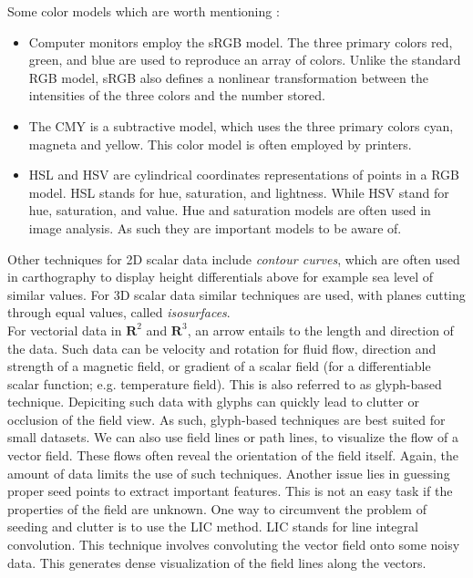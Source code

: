 \documentclass[main.tex]{subfiles}
\begin{document}
Some color models which are worth mentioning :
\begin{itemize}
\item Computer monitors employ the sRGB model. The three primary colors red, green, 
and blue are used to reproduce an array of colors. Unlike the standard RGB model, sRGB also 
defines a nonlinear transformation between the intensities of the three colors and the number 
stored.
\item The CMY is a subtractive model, which uses the three primary colors cyan, magneta and
yellow. This color model is often employed by printers.
\item HSL and HSV are cylindrical coordinates representations of points in a RGB model. HSL
stands for hue, saturation, and lightness. While HSV stand for hue, saturation, and value.
Hue and saturation models are often used in image analysis. As such they are important models 
to be aware of.
\end{itemize}
Other techniques for 2D scalar data include \emph{contour curves}, which are often used in carthography
to display height differentials above for example sea level of similar values. For 3D scalar data similar 
techniques are used, with planes cutting through equal values, called \emph{isosurfaces}.
\\

For vectorial data in $\mathbf{R}^2$ and $\mathbf{R}^3$, an arrow entails to the length and 
direction of the data. Such data can be velocity and 
rotation for fluid flow, direction and strength of a magnetic field, or gradient of a scalar 
field (for a differentiable scalar function; e.g. temperature field). This is also referred
to as glyph-based technique. Depiciting such data with glyphs can quickly lead to clutter 
or occlusion of the field view. As such, glyph-based techniques are best suited for small 
datasets. We can also use field lines or path lines, to visualize the flow of a vector field. 
These flows often reveal the orientation of the field itself.
Again, the amount of data limits the use of such techniques. Another issue lies in guessing
proper seed points to extract important features. This is not an easy task if the properties of 
the field are unknown. One way to circumvent the problem of seeding and clutter is to use the LIC 
method\cite{CL93}. LIC stands for line integral convolution. This technique involves 
convoluting the vector field onto some noisy data. This generates dense visualization of the 
field lines along the vectors.
\\
\end{document}
